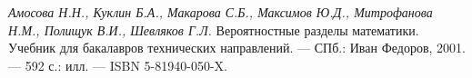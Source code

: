 \documentclass[12pt]{article}
\begin{document}

\newpage
\begin{thebibliography}{}
    \textit{Амосова Н.Н., Куклин Б.А., Макарова С.Б., Максимов Ю.Д., Митрофанова Н.М., Полищук В.И., Шевляков Г.Л.} Вероятностные разделы математики. Учебник для бакалавров технических направлений. –– СПб.: Иван Федоров, 2001. –– 592 с.: илл. — ISBN 5-81940-050-X.
\end{thebibliography}
\end{document}
